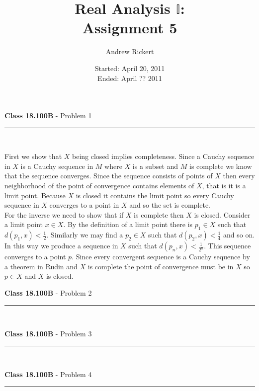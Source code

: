 \documentclass[11pt,reqno]{article}
\title{Real Analysis $\mathbb{I}$: \\ Assignment 5}
\author{Andrew Rickert}
\date{Started: April 20, 2011 \\ \hspace{1pt} Ended: April ??  2011}                                           %
\begin{document}
\maketitle


\begin{flushleft} 
\textbf{Class 18.100B} - Problem 1\\
\rule{500pt}{1pt}\\
\end{flushleft} 

First we show that $X$ being closed implies completeness. Since a Cauchy sequence in $X$ is a Cauchy sequence in $M$ where $X$ is a subset and $M$ is complete we know that the sequence converges. Since the sequence consists of points of $X$ then every neighborhood of the point of convergence contains elements of $X$, that is it is a limit point. Because $X$ is closed it contains the limit point so every Cauchy sequence in $X$ converges to a point in $X$ and so the set is complete.\\
\indent For the inverse we need to show that if $X$ is complete then $X$ is closed. Consider a limit point $x \in X$. By the definition of a limit point there is $p_1 \in X$ such that $d(p_1,x) < \frac{1}{2}$. Similarly we may find a $p_2 \in X$ such that $d(p_2,x) < \frac{1}{4}$ and so on. In this way we produce a sequence in $X$ such that $d(p_n,x) < \frac{1}{2^n}$. This sequence converges to a point $p$. Since every convergent sequence is a Cauchy sequence by a theorem in Rudin and $X$ is complete the point of convergence must be in $X$ so $p \in X$ and $X$ is closed.

\vspace{15pt}
\begin{flushleft} 
\textbf{Class 18.100B} - Problem 2\\
\rule{500pt}{1pt}\\
\end{flushleft} 


\vspace{15pt}
\begin{flushleft} 
\textbf{Class 18.100B} - Problem 3\\
\rule{500pt}{1pt}\\
\end{flushleft} 


\vspace{15pt}
\begin{flushleft} 
\textbf{Class 18.100B} - Problem 4\\
\rule{500pt}{1pt}\\
\end{flushleft} 
\end{document}
